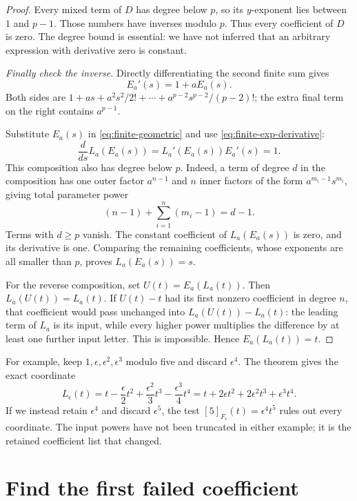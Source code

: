 \begin{proof}
Every mixed term of \(D\) has degree below \(p\), so its \(y\)-exponent lies between \(1\) and \(p-1\). Those numbers have inverses modulo \(p\). Thus every coefficient of \(D\) is zero. The degree bound is essential: we have not inferred that an arbitrary expression with derivative zero is constant.

\emph{Finally check the inverse.} Directly differentiating the second finite sum gives
\begin{equation}\label{eq:finite-exp-derivative}
 E_a'(s)=1+aE_a(s).
\end{equation}
Both sides are \(1+as+a^2s^2/2!+\cdots+a^{p-2}s^{p-2}/(p-2)!\); the extra final term on the right contains \(a^{p-1}\).

Substitute \(E_a(s)\) in \eqref{eq:finite-geometric} and use \eqref{eq:finite-exp-derivative}:
\[
 \frac{d}{ds}L_a(E_a(s))
 =L_a'(E_a(s))E_a'(s)=1.
\]
This composition also has degree below \(p\). Indeed, a term of degree \(d\) in the composition has one outer factor \(a^{n-1}\) and \(n\) inner factors of the form \(a^{m_i-1}s^{m_i}\), giving total parameter power
\[
 (n-1)+\sum_{i=1}^{n}(m_i-1)=d-1.
\]
Terms with \(d\ge p\) vanish. The constant coefficient of \(L_a(E_a(s))\) is zero, and its derivative is one. Comparing the remaining coefficients, whose exponents are all smaller than \(p\), proves \(L_a(E_a(s))=s\).

For the reverse composition, set \(U(t)=E_a(L_a(t))\). Then \(L_a(U(t))=L_a(t)\). If \(U(t)-t\) had its first nonzero coefficient in degree \(n\), that coefficient would pass unchanged into \(L_a(U(t))-L_a(t)\): the leading term of \(L_a\) is its input, while every higher power multiplies the difference by at least one further input letter. This is impossible. Hence \(E_a(L_a(t))=t\).
\end{proof}

For example, keep \(1,\epsilon,\epsilon^2,\epsilon^3\) modulo five and discard \(\epsilon^4\). The theorem gives the exact coordinate
\[
 L_\epsilon(t)=t-\frac{\epsilon}{2}t^2
 +\frac{\epsilon^2}{3}t^3-\frac{\epsilon^3}{4}t^4
 =t+2\epsilon t^2+2\epsilon^2t^3+\epsilon^3t^4.
\]
If we instead retain \(\epsilon^4\) and discard \(\epsilon^5\), the test \([5]_{F_\epsilon}(t)=\epsilon^4t^5\) rules out every coordinate. The input powers have not been truncated in either example; it is the retained coefficient list that changed.

\section{Find the first failed coefficient}\label{sec:first-obstruction}

